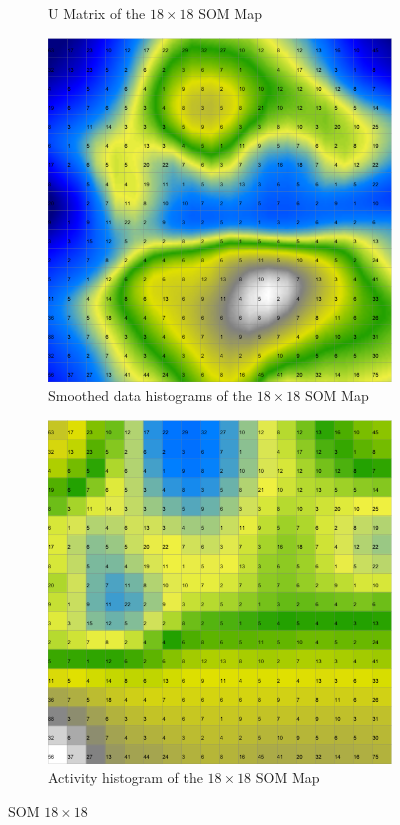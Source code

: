 \documentclass{acm_proc_article-sp}
\begin{document}
\begin{figure}
\begin{subfigure}[b]{0.45\linewidth}
    \caption{U Matrix of the $18\times18$ SOM Map}
    \label{fig:wine-mid-u-matrix}
\end{subfigure}
\begin{subfigure}[b]{0.45\linewidth}
    \includegraphics[width=\linewidth]{img/wine-mid-smoothed-data-histogram}
    \caption{Smoothed data histograms of the $18\times18$ SOM Map}
    \label{fig:wine-mid-smoothed-data-histogram}
\end{subfigure}
\begin{subfigure}[b]{0.45\linewidth}
    \includegraphics[width=\linewidth]{img/wine-mid-activity-histogram}
    \caption{Activity histogram of the $18\times18$ SOM Map}
    \label{fig:wine-mid-activity-histogram}
\end{subfigure}
\caption{SOM $18\times18$}
\end{figure}
\end{document}
